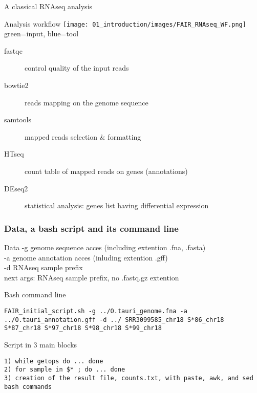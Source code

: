 \begin{frame}{A classical RNAseq analysis}
\begin{block}{Analysis workflow}
    \texttt{[image: 01\_introduction/images/FAIR\_RNAseq\_WF.png]}\\
green=input, blue=tool
\end{block}
\footnotesize{
\begin{description}
    \item[fastqc] control quality of the input reads
    \item[bowtie2] reads mapping on the genome sequence
    \item[samtools] mapped reads selection $\&$ formatting
    \item[HTseq] count table of mapped reads on genes (annotations)
    \item[DEseq2] statistical analysis: genes list having differential expression
\end{description}
}
\end{frame}
\begin{frame}[containsverbatim]
\frametitle{Data, a bash script and its command line}
\begin{exampleblock}{Data}
-g genome sequence acces (including extention .fna, .fasta)\\
-a genome annotation acces (inluding extention .gff)\\
-d RNAseq sample prefix\\
next args: RNAseq sample prefix, no .fastq.gz extention
\end{exampleblock}
\begin{exampleblock}{Bash command line}
\begin{lstlisting}
FAIR_initial_script.sh -g ../O.tauri_genome.fna -a ../O.tauri_annotation.gff -d ../ SRR3099585_chr18 S*86_chr18 S*87_chr18 S*97_chr18 S*98_chr18 S*99_chr18
\end{lstlisting}
\end{exampleblock}
\begin{exampleblock}{Script in 3 main blocks}
\begin{lstlisting}
1) while getops do ... done   
2) for sample in $* ; do ... done   
3) creation of the result file, counts.txt, with paste, awk, and sed bash commands
\end{lstlisting}
\end{exampleblock}
\end{frame}
